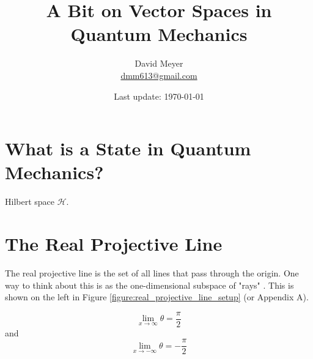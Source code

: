 \documentclass{article}
\title{A Bit on Vector Spaces in Quantum Mechanics}
\author{David Meyer \\ \href{mailto:dmm613@gmail.com}
                            {dmm613@gmail.com}}
\date{Last update: \today}
\theoremstyle{definition}
\begin{document}
\maketitle
%
%
%
\section{What is a State in Quantum Mechanics?}
Hilbert space $\mathcal{H}$.
%
%
%
\section{The Real Projective Line}
\label{section:real_projective_line}
The real projective line is the set of all lines that pass
through the origin. One way to think about this is as the
one-dimensional subspace of "rays" 
\cite{youtube:vector_spaces_and_quantum_mechanics,wolfram:ray}. 
This is shown on the left in Figure
\ref{figure:real_projective_line_setup} (or Appendix A).

\bigskip
\noindent
{}

\begin{equation*}
   \lim\limits_{x \to \infty} \theta = \frac{\pi}{2} 
\end{equation*}
\noindent
and
\begin{equation*}
   \lim\limits_{x \to -\infty} \theta = -\frac{\pi}{2} 
\end{equation*}
\end{document}
